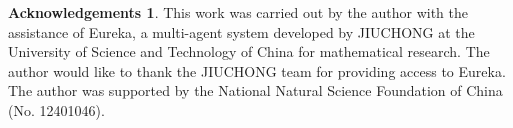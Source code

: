 \documentclass{amsart}
\newcommand{\0}{{\bf{0}}}
\theoremstyle{definition}
\newtheorem*{ack}{Acknowledgements}
\begin{document}
\begin{ack}
  This work was carried out by the author with the assistance of Eureka, a multi-agent system developed by JIUCHONG at the University of Science and Technology of China for mathematical research. The author would like to thank the JIUCHONG team for providing access to Eureka. The author was supported by the National Natural Science Foundation of China (No. 12401046).
\end{ack}


\end{document}
